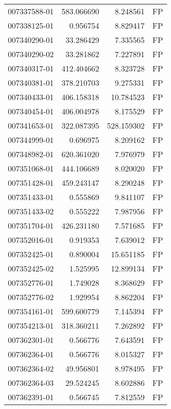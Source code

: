 \begin{tabular}{lrrl}
007337588-01 &  583.066690 &       8.248561 &   FP \\
007338125-01 &    0.956754 &       8.829417 &   FP \\
007340290-01 &   33.286429 &       7.335565 &   FP \\
007340290-02 &   33.281862 &       7.227891 &   FP \\
007340317-01 &  412.404662 &       8.323728 &   FP \\
007340381-01 &  378.210703 &       9.275331 &   FP \\
007340433-01 &  406.158318 &      10.784523 &   FP \\
007340454-01 &  406.004978 &       8.175529 &   FP \\
007341653-01 &  322.087395 &     528.159302 &   FP \\
007344999-01 &    0.696975 &       8.209162 &   FP \\
007348982-01 &  620.361020 &       7.976979 &   FP \\
007351068-01 &  444.106689 &       8.020020 &   FP \\
007351428-01 &  459.243147 &       8.290248 &   FP \\
007351433-01 &    0.555869 &       9.841107 &   FP \\
007351433-02 &    0.555222 &       7.987956 &   FP \\
007351704-01 &  426.231180 &       7.571685 &   FP \\
007352016-01 &    0.919353 &       7.639012 &   FP \\
007352425-01 &    0.890004 &      15.651185 &   FP \\
007352425-02 &    1.525995 &      12.899134 &   FP \\
007352776-01 &    1.749028 &       8.368629 &   FP \\
007352776-02 &    1.929954 &       8.862204 &   FP \\
007354161-01 &  599.600779 &       7.145394 &   FP \\
007354213-01 &  318.360211 &       7.262892 &   FP \\
007362301-01 &    0.566776 &       7.643591 &   FP \\
007362364-01 &    0.566776 &       8.015327 &   FP \\
007362364-02 &   49.956801 &       8.978495 &   FP \\
007362364-03 &   29.524245 &       8.602886 &   FP \\
007362391-01 &    0.566745 &       7.812559 &   FP \\

\end{tabular}
